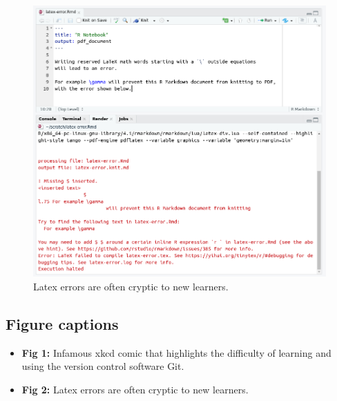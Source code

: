 \documentclass[
  12 pt,
]{paper}
\providecommand{\tightlist}{%
  \setlength{\itemsep}{0pt}\setlength{\parskip}{0pt}}
\begin{document}
\begin{figure}

{\centering \includegraphics[width=1\linewidth]{img/r-latex-error} 

}

\caption{Latex errors are often cryptic to new learners.}\label{fig:latex-errors}
\end{figure}

\newpage

\hypertarget{figure-captions}{%
\subsection{Figure captions}\label{figure-captions}}

\begin{itemize}
\tightlist
\item
  \textbf{Fig 1:} Infamous xkcd comic that highlights the difficulty of learning and using the version control software Git.
\item
  \textbf{Fig 2:} Latex errors are often cryptic to new learners.
\end{itemize}

\newpage
\singlespace
\footnotesize

\printbibliography
\end{document}
